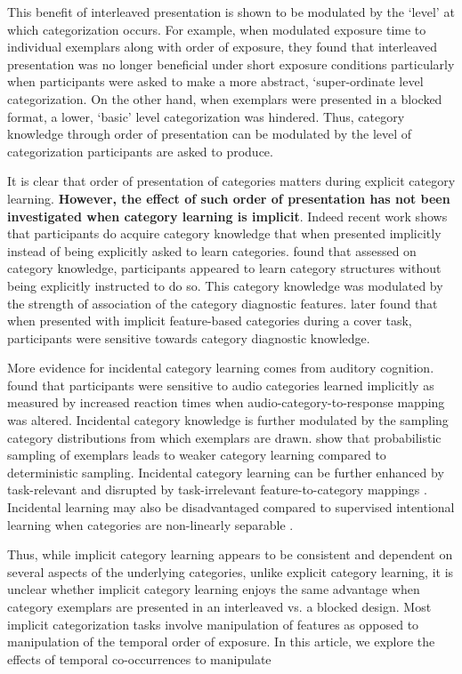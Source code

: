 This benefit of interleaved presentation is shown to be modulated by the `level' at which categorization occurs. For example, when \cite{mack2015dynamics} modulated exposure time to individual exemplars along with order of exposure, they found that interleaved presentation was no longer beneficial under short exposure conditions particularly when participants were asked to make a more abstract, `super-ordinate level categorization. On the other hand, when exemplars were presented in a blocked format, a lower, `basic' level categorization was hindered. Thus, category knowledge through order of presentation can be modulated by the level of categorization participants are asked to produce.

It is clear that order of presentation of categories matters during explicit category learning. \textbf{However, the effect of such order of presentation has not been investigated when category learning is implicit}. Indeed recent work shows that participants do acquire category knowledge that when presented implicitly instead of being explicitly asked to learn categories. \cite{unger2022ready} found that assessed on category knowledge, participants appeared to learn category structures without being explicitly instructed to do so. This category knowledge was modulated by the strength of association of the category diagnostic features. \cite{unger2023without} later found that when presented with implicit feature-based categories during a cover task, participants were sensitive towards category diagnostic knowledge. 

More evidence for incidental category learning comes from auditory cognition. \cite{gabay2015incidental} found that participants were sensitive to audio categories learned implicitly as measured by increased reaction times when audio-category-to-response mapping was altered. Incidental category knowledge is further modulated by the sampling category distributions from which exemplars are drawn. \cite{roark2018task} show that probabilistic sampling of exemplars leads to weaker category learning compared to deterministic sampling. Incidental category learning can be further enhanced by task-relevant and disrupted by task-irrelevant feature-to-category mappings \cite{roark2022representational}. Incidental learning may also be disadvantaged compared to supervised intentional learning when categories are non-linearly separable \cite{love2002comparing}.

Thus, while implicit category learning appears to be consistent and dependent on several aspects of the underlying categories, unlike explicit category learning, it is unclear whether implicit category learning enjoys the same advantage when category exemplars are presented in an interleaved vs. a blocked design. Most implicit categorization tasks involve manipulation of features as opposed to manipulation of the temporal order of exposure. In this article, we explore the effects of temporal co-occurrences to manipulate


